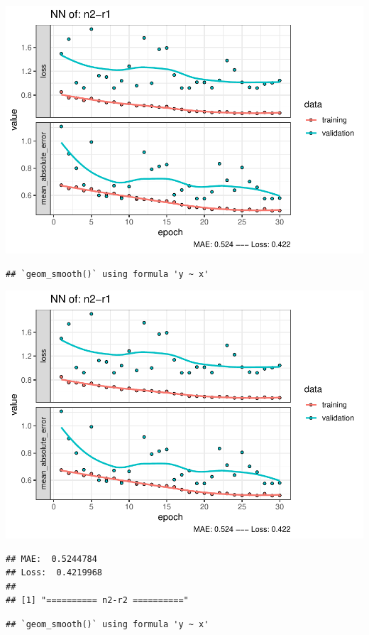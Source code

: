 \documentclass[
]{article}
\begin{document}
\includegraphics{project-code_files/figure-latex/unnamed-chunk-18-17.pdf}

\begin{verbatim}
## `geom_smooth()` using formula 'y ~ x'
\end{verbatim}

\includegraphics{project-code_files/figure-latex/unnamed-chunk-18-18.pdf}

\begin{verbatim}
## MAE:  0.5244784
## Loss:  0.4219968 
## 
## [1] "========== n2-r2 =========="
\end{verbatim}

\begin{verbatim}
## `geom_smooth()` using formula 'y ~ x'
\end{verbatim}
\end{document}

